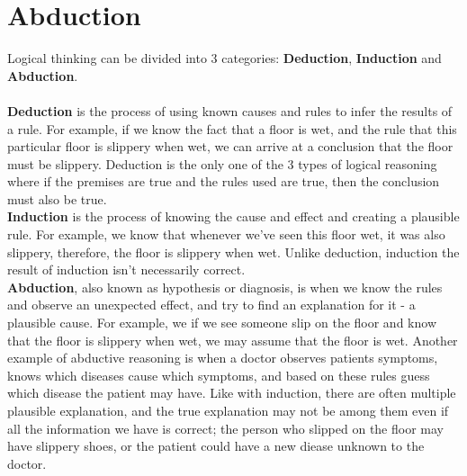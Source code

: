 \chapter{Abduction}\label{chap:Abduction}

Logical thinking can be divided into 3 categories: \textbf{Deduction}, \textbf{Induction} and \textbf{Abduction}. \\ \\
\textbf{Deduction} is the process of using known causes and rules to infer the results of a rule. For example, if we know the fact that a floor is wet, and the rule that this particular floor is slippery when wet, we can arrive at a conclusion that the floor must be slippery. Deduction is the only one of the 3 types of logical reasoning where if the premises are true and the rules used are true, then the conclusion must also be true. \\ 
\textbf{Induction} is the process of knowing the cause and effect and creating a plausible rule. For example, we know that whenever we've seen this floor wet, it was also slippery, therefore, the floor is slippery when wet. Unlike deduction, induction the result of induction isn't necessarily correct. \\
\textbf{Abduction}, also known as hypothesis or diagnosis, is when we know the rules and observe an unexpected effect, and try to find an explanation for it - a plausible cause. For example, we if we see someone slip on the floor and know that the floor is slippery when wet, we may assume that the floor is wet. Another example of abductive reasoning is when a doctor observes patients symptoms, knows which diseases cause which symptoms, and based on these rules guess which disease the patient may have. Like with induction, there are often multiple plausible explanation, and the true explanation may not be among them even if all the information we have is correct; the person who slipped on the floor may have slippery shoes, or the patient could have a new diease unknown to the doctor.\\ 



